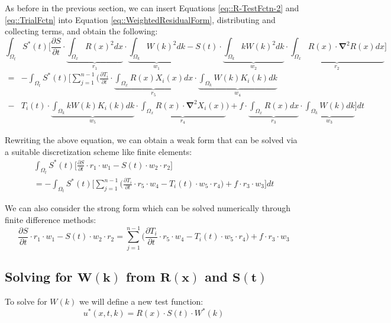 \documentclass{article}
\def\ds{\displaystyle}
\def\pd{\partial}
\def\grad{\mathbf\nabla}
\begin{document}
As before in the previous section, we can insert Equations \ref{eq::R-TestFctn-2} and \ref{eq::TrialFctn} into Equation \ref{eq::WeightedResidualForm}, distributing and collecting terms, and obtain the following:
\begin{equation*}
\ds\int_{\Omega_t} S^*(t) \bigg[ \frac{\pd S}{\pd t} \cdot \underbrace{\ds\int_{\Omega_x} R(x)^2 dx}_{r_1} \cdot \underbrace{\ds\int_{\Omega_k}W(k)^2 dk}_{w_1} - S(t) \cdot \underbrace{\ds\int_{\Omega_k}kW(k)^2dk}_{w_2} \cdot \underbrace{\int_{\Omega_x} R(x)\cdot\grad^2R(x) dx}_{r_2} \bigg]
\end{equation*}\vspace{-15pt}
\begin{align}
= & - \ds\int_{\Omega_t} S^*(t) \Bigg[ \ds\sum_{j=1}^{n-1} \bigg( \frac{\pd T_i}{\pd t} \cdot  \underbrace{\ds\int_{\Omega_x} R(x) X_i(x) dx}_{r_5} \cdot \underbrace{\ds\int_{\Omega_k}W(k)K_i(k) dk}_{w_4} \nonumber\\
 - & T_i(t)\cdot \underbrace{\ds\int_{\Omega_k} kW(k)K_i(k)dk}_{w_5} \cdot \underbrace{\ds\int_{\Omega_x} R(x)\cdot\grad^2X_i(x)}_{r_4} \bigg) + f \cdot \underbrace{\ds\int_{\Omega_x} R(x)dx}_{r_3} \cdot \underbrace{\ds\int_{\Omega_k} W(k)dk}_{w_3} \Bigg] dt
\end{align}

Rewriting the above equation, we can obtain a weak form that can be solved via a suitable discretization scheme like finite elements:
\begin{gather}
\ds\int_{\Omega_t} S^*(t) \bigg[ \frac{\pd S}{\pd t} \cdot r_1 \cdot w_1- S(t) \cdot w_2 \cdot r_2 \bigg] \nonumber \\
= - \ds\int_{\Omega_t} S^*(t) \Bigg[ \ds\sum_{j=1}^{n-1} \bigg( \frac{\pd T_i}{\pd t} \cdot r_5 \cdot w_4 - T_i(t)\cdot w_5 \cdot r_4 \bigg) + f \cdot r_3 \cdot w_3 \Bigg] dt
\end{gather}

We can also consider the strong form which can be solved numerically through finite difference methods:
\begin{equation}
\label{eq::S-Strong}
\frac{\pd S}{\pd t} \cdot r_1 \cdot w_1 - S(t) \cdot w_2 \cdot r_2 = \ds\sum_{j=1}^{n-1} \bigg( \frac{\pd T_i}{\pd t} \cdot r_5 \cdot w_4 - T_i(t)\cdot w_5 \cdot r_4 \bigg) + f \cdot r_3 \cdot w_3
\end{equation}

\subsection{Solving for $\mathbf{W(k)}$ from $\mathbf{R(x)}$ and $\mathbf{S(t)}$}
To solve for $W(k)$ we will define a new test function:
\begin{equation}
\label{eq::R-TestFctn-3}
u^*(x,t,k) = R(x) \cdot S(t) \cdot W^*(k)
\end{equation}
\end{document}
